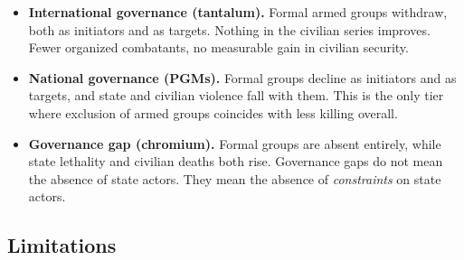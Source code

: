 \documentclass[11pt]{article}
\begin{document}
\begin{itemize}
    \item \textbf{International governance (tantalum).} Formal armed groups withdraw, both as initiators and as targets. Nothing in the civilian series improves. Fewer organized combatants, no measurable gain in civilian security.
    \item \textbf{National governance (PGMs).} Formal groups decline as initiators and as targets, and state and civilian violence fall with them. This is the only tier where exclusion of armed groups coincides with less killing overall.
    \item \textbf{Governance gap (chromium).} Formal groups are absent entirely, while state lethality and civilian deaths both rise. Governance gaps do not mean the absence of state actors. They mean the absence of \textit{constraints} on state actors.
\end{itemize}





\subsection{Limitations}
\end{document}
